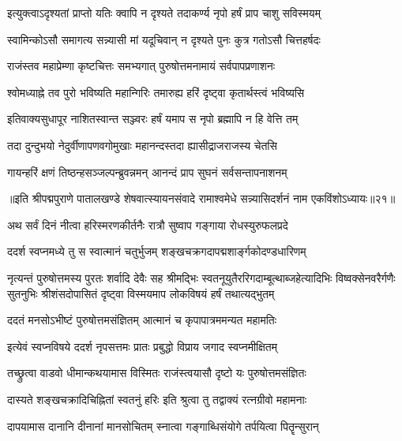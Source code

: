 \twolineshloka
{इत्युक्त्वाऽदृश्यतां प्राप्तो यतिः क्वापि न दृश्यते}
{तदाकर्ण्य नृपो हर्षं प्राप चाशु सविस्मयम्}%


\twolineshloka
{स्वामिन्कोऽसौ समागत्य सन्न्यासी मां यदूचिवान्}
{न दृश्यते पुनः कुत्र गतोऽसौ चित्तहर्षदः}%


\twolineshloka
{राजंस्तव महाप्रेम्णा कृष्टचित्तः समभ्यगात्}
{पुरुषोत्तमनामायं सर्वपापप्रणाशनः}%

\twolineshloka
{श्वोमध्याह्ने तव पुरो भविष्यति महान्गिरिः}
{तमारुह्य हरिं दृष्ट्वा कृतार्थस्त्वं भविष्यसि}%

\twolineshloka
{इतिवाक्यसुधापूर नाशितस्वान्त सञ्ज्वरः}
{हर्षं यमाप स नृपो ब्रह्मापि न हि वेत्ति तम्}%

\twolineshloka
{तदा दुन्दुभयो नेदुर्वीणापणवगोमुखाः}
{महानन्दस्तदा ह्यासीद्राजराजस्य चेतसि}%

\twolineshloka
{गायन्हरिं क्षणं तिष्ठन्हसञ्जल्पन्ब्रुवन्नमन्}
{आनन्दं प्राप सुघनं सर्वसन्तापनाशनम्}%

॥इति श्रीपद्मपुराणे पातालखण्डे शेषवात्स्यायनसंवादे रामाश्वमेधे सन्न्यासिदर्शनं नाम एकविंशोऽध्यायः॥२१॥



\twolineshloka
{अथ सर्वं दिनं नीत्वा हरिस्मरणकीर्तनैः}
{रात्रौ सुष्वाप गङ्गाया रोधस्युरुफलप्रदे}%

\twolineshloka
{ददर्श स्वप्नमध्ये तु स स्वात्मानं चतुर्भुजम्}
{शङ्खचक्रगदापद्मशार्ङ्गकोदण्डधारिणम्}%

\fourlineindentedshloka
{नृत्यन्तं पुरुषोत्तमस्य पुरतः शर्वादि देवैः सह}
{श्रीमद्भिः स्वतनूयुतैररिगदाम्बूत्थाब्जहेत्यादिभिः}
{विष्वक्सेनवरैर्गणैः सुतनुभिः श्रीशंसदोपासितं}
{दृष्ट्वा विस्मयमाप लोकविषयं हर्षं तथात्यद्भुतम्}%

\twolineshloka
{ददतं मनसोऽभीष्टं पुरुषोत्तमसंज्ञितम्}
{आत्मानं च कृपापात्रममन्यत महामतिः}%

\twolineshloka
{इत्येवं स्वप्नविषये ददर्श नृपसत्तमः}
{प्रातः प्रबुद्धो विप्राय जगाद स्वप्नमीक्षितम्}%

\twolineshloka
{तच्छ्रुत्वा वाडवो धीमान्कथयामास विस्मितः}
{राजंस्त्वयासौ दृष्टो यः पुरुषोत्तमसंज्ञितः}%

\twolineshloka
{दास्यते शङ्खचक्रादिचिह्नितां स्वतनुं हरिः}
{इति श्रुत्वा तु तद्वाक्यं रत्नग्रीवो महामनाः}%

\twolineshloka
{दापयामास दानानि दीनानां मानसोचितम्}
{स्नात्वा गङ्गाब्धिसंयोगे तर्पयित्वा पितॄन्सुरान्}%

